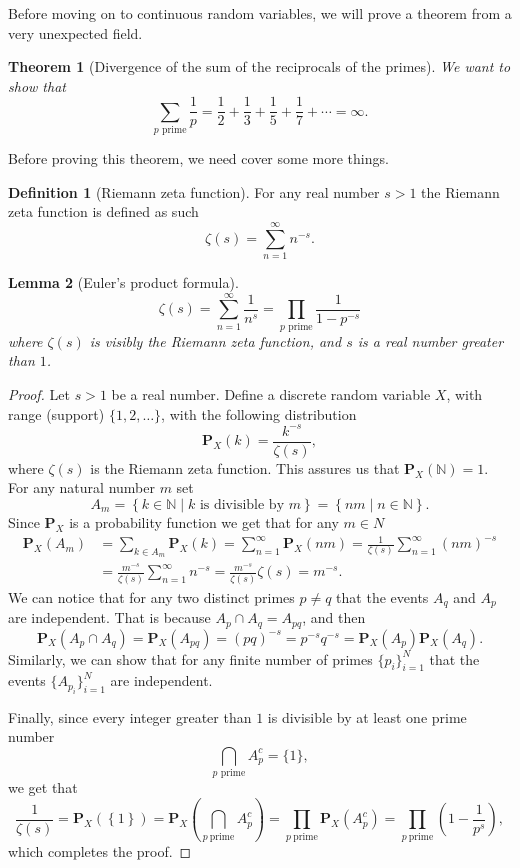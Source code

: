 \documentclass[11pt,a4paper]{article}
\theoremstyle{definition}
\newtheorem{definition}{Definition}[section]
\theoremstyle{plain}
\newtheorem{theorem}{Theorem}[section]
\newtheorem{lemma}[theorem]{Lemma}
\newcommand{\N}{\mathbb{N}}
\newcommand{\Prob}{\mathbf{P}}
\newcommand{\set}[2]{ \left\{ #1 \mid #2 \right\} }
\begin{document}
  Before moving on to continuous random variables, we will prove a theorem
  from a very unexpected field.
  \begin{theorem}[Divergence of the sum of the reciprocals of the primes]
    \label{thm:drp}
    We want to show that
    \[
      \sum _{p{\text{ prime}}}{\frac {1}{p}} =
      {\frac {1}{2}}+
      {\frac {1}{3}}+
      {\frac {1}{5}}+
      {\frac {1}{7}}+
      \cdots = \infty.
    \]
  \end{theorem}
  Before proving this theorem, we need cover some more things.
  \begin{definition}[Riemann zeta function]
    For any real number $s > 1$ the Riemann zeta function is defined
    as such
    \[
      \zeta(s) = \sum_{n=1}^{\infty} n^{-s}.
    \]
  \end{definition}
  \begin{lemma}[Euler's product formula]\label{lem:epf}
    \[
      \zeta (s) =
      \sum _{n=1}^{\infty }{\frac {1}{n^{s}}} =
      \prod _{p{\text{ prime}}}{\frac {1}{1-p^{-s}}}
    \]
    where $\zeta(s)$ is visibly the Riemann zeta function, and $s$
    is a real number greater than $1$.
  \end{lemma}
  \begin{proof}
    Let $s > 1$ be a real number. Define a discrete random variable $X$,
    with range (support) $\{1,2,\dots\}$, with the following distribution
    \[
      \Prob_X(k) = \frac{k^{-s}}{\zeta(s)},
    \]
  where $\zeta(s)$ is the Riemann zeta function.
  This assures us that $\Prob_X(\N) = 1$. 
  For any natural number $m$ set
  \[
    A_m = 
    \set{k \in \N}{\text{$k$ is divisible by $m$}} =
    \set{nm}{n \in \N}.
  \]
  Since $\Prob_X$ is a probability function we get that for any $m \in N$
  \begin{align*}
    \Prob_{X}\left(A_{m}\right) 
    &= \sum_{k \in A_{m}} \Prob_{X}\left(k\right)
    = \sum_{n=1}^{\infty} \Prob_{X}\left(n m\right)
    = {\frac{1}{\zeta(s)}} \sum_{n=1}^{\infty} \left(n m\right)^{-s} \\
    &= {\frac{m^{-s}}{\zeta(s)}} \sum_{n=1}^{\infty} n^{-s}
    = {\frac{m^{-s}}{\zeta(s)}} \zeta(s)
    = m^{-s}.
  \end{align*}
  We can notice that for any two distinct primes $p \neq q$ that the events
  $A_q$ and $A_p$ are independent. That is because $A_p \cap A_q = A_{pq}$,
  and then
  \[
    \Prob_X(A_p \cap A_q) =
    \Prob_X(A_{pq}) =
    (pq)^{-s} =
    p^{-s} q^{-s} =
    \Prob_X(A_p) \Prob_X(A_q).
  \]
  Similarly, we can show that for any finite number of primes 
  $\{p_i\}_{i=1}^{N}$ that the events $\{A_{p_i}\}_{i=1}^{N}$ are independent.

  Finally, since every integer greater than $1$ is divisible by at least
  one prime number
  \[
    \bigcap_{p\text{ prime}} A_p^c = \{1\},
  \]
  we get that
  \[
    {\frac{1}{\zeta(s)}} = 
    \Prob_{X}\left(\left\{1\right\}\right) = 
    \Prob_{X}\left(\bigcap_{p \ \mathrm{prime}} A_{p}^{c}\right) = 
    \prod_{p \ \mathrm{prime}} \Prob_{X}\left(A_{p}^{c}\right) = 
    \prod_{p \ \mathrm{prime}} \left(1 - \frac{1}{p^{s}}\right),
  \]
  which completes the proof.
  \end{proof}
\end{document}
